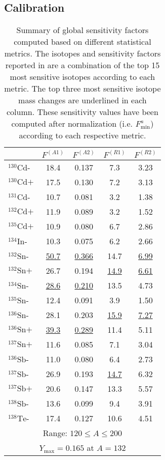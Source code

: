 \documentclass[aps,prc,reprint,showpacs,floatfix,nofootinbib]{revtex4-1}
\begin{document}
\subsection{Calibration}
\begin{table}
\center
\begin{tabular}{lcccc} 
  & $F^{(A1)}$ & $F^{(A2)}$ & $F^{(R1)}$ & $F^{(R2)}$ \\ \hline \hline
 $^{130}\textrm{Cd} \texttt{-} $& 18.4 & 0.137 & 7.3  & 3.23 \\
 $^{130}\textrm{Cd} \texttt{+} $& 17.5 & 0.130 & 7.2  & 3.13 \\
 $^{131}\textrm{Cd} \texttt{-} $& 10.7 & 0.081 & 3.2  & 1.38 \\
 $^{132}\textrm{Cd} \texttt{+} $& 11.9 & 0.089 & 3.2  & 1.52 \\
 $^{135}\textrm{Cd} \texttt{+} $& 10.9 & 0.080 & 6.7  & 2.86 \\
 $^{134}\textrm{In} \texttt{-} $& 10.3 & 0.075 & 6.2  & 2.66 \\
 $^{132}\textrm{Sn} \texttt{-} $& \underline{50.7} & \underline{0.366} & 14.7 & \underline{6.99} \\
 $^{132}\textrm{Sn} \texttt{+} $& 26.7 & 0.194 & \underline{14.9} & \underline{6.61} \\
 $^{134}\textrm{Sn} \texttt{-} $& \underline{28.6} & \underline{0.210} & 13.5 & 4.73 \\
 $^{135}\textrm{Sn} \texttt{-} $& 12.4 & 0.091 & 3.9  & 1.50 \\
 $^{136}\textrm{Sn} \texttt{-} $& 28.1 & 0.203 & \underline{15.9} & \underline{7.27} \\
 $^{136}\textrm{Sn} \texttt{+} $& \underline{39.3} & \underline{0.289} & 11.4 & 5.11 \\
 $^{137}\textrm{Sn} \texttt{+} $& 11.6 & 0.085 & 7.1  & 3.04 \\
 $^{136}\textrm{Sb} \texttt{-} $& 11.0 & 0.080 & 6.4  & 2.73 \\
 $^{137}\textrm{Sb} \texttt{-} $& 26.9 & 0.193 & \underline{14.7} & 6.32 \\
 $^{137}\textrm{Sb} \texttt{+} $& 20.6 & 0.147 & 13.3 & 5.57 \\
 $^{138}\textrm{Sb} \texttt{-} $& 13.6 & 0.099 & 9.4  & 3.91 \\
 $^{138}\textrm{Te} \texttt{-} $& 17.4 & 0.127 & 10.6 & 4.51 \\ \hline
 \multicolumn{5}{c}{Range: $120 \leq A \leq 200$} \\
 \multicolumn{5}{c}{$Y_\textrm{max} = 0.165$ at $A=132$} 
\end{tabular}
\caption{Summary of global sensitivity factors computed based on different statistical metrics. The isotopes and sensitivity factors 
reported in are a combination of the top 15 most sensitive isotopes according to each metric. The 
top three most sensitive isotope mass changes are underlined in each column. These sensitivity 
values have been computed after normalization (i.e. $F^a_\textrm{min}$) according to 
each respective metric. \label{table:finalReportedValues} }
\end{table}
\end{document}
